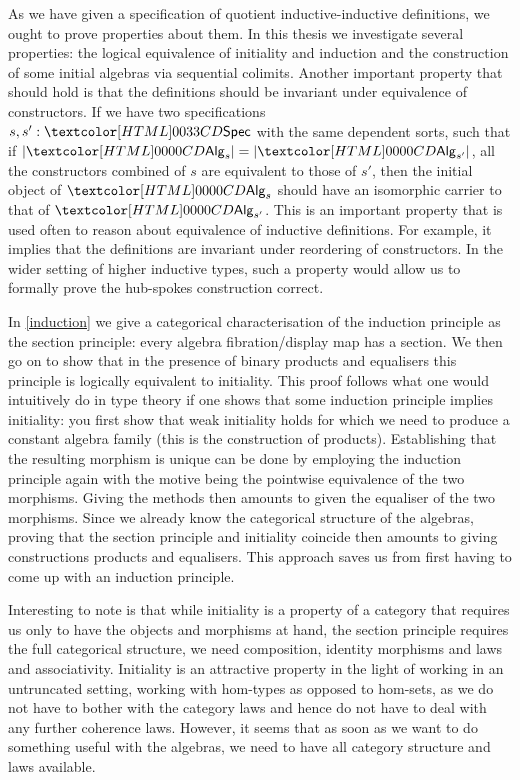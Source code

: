 As we have given a specification of quotient inductive-inductive
definitions, we ought to prove properties about them. In this thesis
we investigate several properties: the logical equivalence of
initiality and induction and the construction of some initial algebras
via sequential colimits. Another important property that should hold
is that the definitions should be invariant under equivalence of
constructors. If we have two specifications $s, s' : \specty$ with the
same dependent sorts, such that if $| \Alg_s | = | \Alg_{s'} |$, \ie
all the constructors combined of $s$ are equivalent to those of $s'$,
then the initial object of $\Alg_s$ should have an isomorphic carrier
to that of $\Alg_{s'}$. This is an important property that is used
often to reason about equivalence of inductive definitions. For
example, it implies that the definitions are invariant under
reordering of constructors. In the wider setting of higher inductive
types, such a property would allow us to formally prove the hub-spokes
construction correct.

In \cref{induction} we give a categorical characterisation of the
induction principle as the section principle: every algebra
fibration/display map has a section. We then go on to show that in the
presence of binary products and equalisers this principle is logically
equivalent to initiality. This proof follows what one would
intuitively do in type theory if one shows that some induction
principle implies initiality: you first show that weak initiality
holds for which we need to produce a constant algebra family (this is
the construction of products). Establishing that the resulting
morphism is unique can be done by employing the induction principle
again with the motive being the pointwise equivalence of the two
morphisms. Giving the methods then amounts to given the equaliser of
the two morphisms. Since we already know the categorical structure of
the algebras, proving that the section principle and initiality
coincide then amounts to giving constructions products and
equalisers. This approach saves us from first having to come up with
an induction principle.

Interesting to note is that while initiality is a property of a
category that requires us only to have the objects and morphisms at
hand, the section principle requires the full categorical structure,
\ie we need composition, identity morphisms and laws and
associativity. Initiality is an attractive property in the light of
working in an untruncated setting, \ie working with hom-types as
opposed to hom-sets, as we do not have to bother with the category
laws and hence do not have to deal with any further coherence
laws. However, it seems that as soon as we want to do something useful
with the algebras, we need to have all category structure and laws
available.

